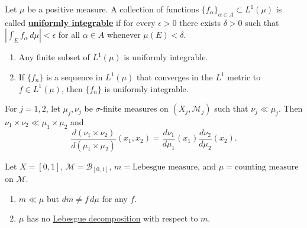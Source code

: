 	\begin{exercise}[Folland 3.11]
		Let $\mu$ be a positive measure. A collection of functions $\{f_\alpha\}_{\alpha \in A} \subset L^1(\mu)$ is called \textbf{\hyperref[def:uniformly-integrable]{uniformly integrable}} if for every $\epsilon > 0$ there exists $\delta > 0$ such that $|\int_E f_\alpha \, d\mu| < \epsilon$ for all $\alpha \in A$ whenever $\mu(E) < \delta$.
		\begin{enumerate}[label=\textbf{\alph*.}]
			\item Any finite subset of $L^1(\mu)$ is uniformly integrable.
			\item If $\{f_n\}$ is a sequence in $L^1(\mu)$ that converges in the $L^1$ metric to $f \in L^1(\mu)$, then $\{f_n\}$ is uniformly integrable.
		\end{enumerate}
	\end{exercise}
	\begin{solution}

	\end{solution}

	\begin{exercise}[Folland 3.12]
		For $j = 1, 2$, let $\mu_j, \nu_j$ be $\sigma$-finite measures on $(X_j, \mathcal{M}_j)$ such that $\nu_j \ll \mu_j$. Then $\nu_1 \times \nu_2 \ll \mu_1 \times \mu_2$ and
		\begin{equation}
			\frac{d(\nu_1 \times \nu_2)}{d(\mu_1 \times \mu_2)}(x_1, x_2) = \frac{d\nu_1}{d\mu_1}(x_1) \frac{d\nu_2}{d\mu_2}(x_2).
		\end{equation}
	\end{exercise}
	\begin{solution}

	\end{solution}

	\begin{exercise}[Folland 3.13]
		Let $X = [0, 1]$, $\mathcal{M} = \mathcal{B}_{[0, 1]}$, $m = \text{Lebesgue measure}$, and $\mu = \text{counting measure}$ on $\mathcal{M}$.
		\begin{enumerate}[label=\textbf{\alph*.}]
			\item $m \ll \mu$ but $dm \neq f \, d\mu$ for any $f$.
			\item $\mu$ has no \hyperref[thm:lebesgue-decomposition-theorem]{Lebesgue decomposition} with respect to $m$.
		\end{enumerate}
	\end{exercise}
	\begin{solution}

	\end{solution}

